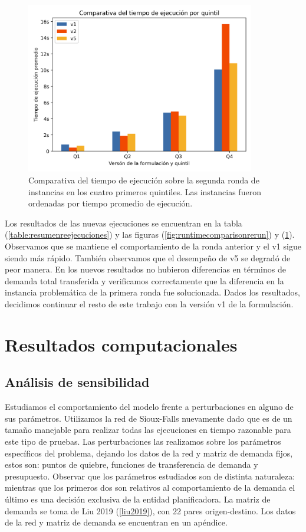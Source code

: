 \documentclass{article}
\begin{document}
  \begin{figure}[h!]
    \centering
    \includegraphics[width=10cm]{../resources/run_time_comparsion_by_quintile_rerun.png}
    \caption{Comparativa del tiempo de ejecución sobre la segunda ronda de instancias en los cuatro primeros quintiles. Las instancias fueron ordenadas por tiempo promedio de ejecución.} \label{fig:firstfourquintilesrerun}
  \end{figure}

  Los resultados de las nuevas ejecuciones se encuentran en la tabla (\ref{table:resumenreejecuciones}) y las figuras (\ref{fig:runtimecomparisonrerun}) y (\ref{fig:firstfourquintilesrerun}). Observamos que se mantiene el comportamiento de la ronda anterior y el v1 sigue siendo más rápido. También observamos que el desempeño de v5 se degradó de peor manera. En los nuevos resultados no hubieron diferencias en términos de demanda total transferida y verificamos correctamente que la diferencia en la instancia problemática de la primera ronda fue solucionada. Dados los resultados, decidimos continuar el resto de este trabajo con la versión v1 de la formulación.

  \section{Resultados computacionales}

  \subsection{Análisis de sensibilidad}

  Estudiamos el comportamiento del modelo frente a perturbaciones en alguno de sus parámetros. Utilizamos la red de Sioux-Falls nuevamente dado que es de un tamaño manejable para realizar todas las ejecuciones en tiempo razonable para este tipo de pruebas. Las perturbaciones las realizamos sobre los parámetros específicos del problema, dejando los datos de la red y matriz de demanda fijos, estos son: puntos de quiebre, funciones de transferencia de demanda y presupuesto. Observar que los parámetros estudiados son de distinta naturaleza: mientras que los primeros dos son relativos al comportamiento de la demanda el último es una decisión exclusiva de la entidad planificadora. La matriz de demanda se toma de Liu 2019 (\ref{liu2019}), con 22 pares origen-destino. Los datos de la red y matriz de demanda se encuentran en un apéndice.
\end{document}
